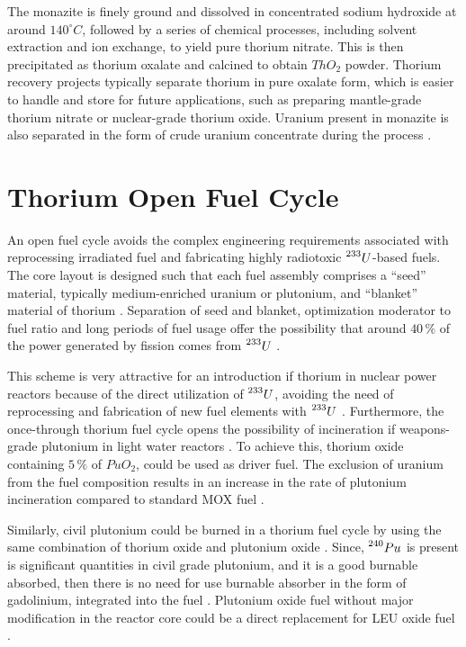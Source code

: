 The monazite is finely ground and dissolved in concentrated sodium hydroxide at around \(140^{\circ}C\), followed by a series of chemical processes, including solvent extraction and ion exchange, to yield pure thorium nitrate. This is then precipitated as thorium oxalate and calcined to obtain \(ThO_2\) powder. Thorium recovery projects typically separate thorium in pure oxalate form, which is easier to handle and store for future applications, such as preparing mantle-grade thorium nitrate or nuclear-grade thorium oxide. Uranium present in monazite is also separated in the form of crude uranium concentrate during the process \cite{IAEA_Th_Potential}.

\section{Thorium Open Fuel Cycle}

An open fuel cycle avoids the complex engineering requirements associated with reprocessing irradiated fuel and fabricating highly radiotoxic \(\prescript{233}{}{U}\)-based fuels. The core layout is designed such that each fuel assembly comprises a ``seed'' material, typically medium-enriched uranium or plutonium, and ``blanket'' material of thorium \cite{IAEA_Th_Potential}. Separation of seed and blanket, optimization moderator to fuel ratio and long periods of fuel usage offer the possibility that around \(40 \, \%\) of the power generated by fission comes from \(\prescript{233}{}{U}\) \cite{IAEA_Th_Potential}.

This scheme is very attractive for an introduction if thorium in nuclear power reactors because of the direct utilization of \(\prescript{233}{}{U}\), avoiding the need of reprocessing and fabrication of new fuel elements with \(\prescript{233}{}{U}\) \cite{IAEA_Th_Potential}. Furthermore, the once-through thorium fuel cycle opens the possibility of incineration if weapons-grade plutonium in light water reactors \cite{IAEA_Th_Potential}. To achieve this, thorium oxide containing \(5 \, \%\) of \(PuO_2\), could be used as driver fuel. The exclusion of uranium from the fuel composition results in an increase in the rate of plutonium incineration compared to standard MOX fuel \cite{IAEA_Th_Potential}.

Similarly, civil plutonium could be burned in a thorium fuel cycle by using the same combination of thorium oxide and plutonium oxide \cite{IAEA_Th_Potential}. Since, \(\prescript{240}{}{Pu}\) is present is significant quantities in civil grade plutonium, and it is a good burnable absorbed, then there is no need for use burnable absorber in the form of gadolinium, integrated into the fuel \cite{IAEA_Th_Potential}. Plutonium oxide fuel without major modification in the reactor core could be a direct replacement for LEU oxide fuel \cite{IAEA_Th_Potential}.

